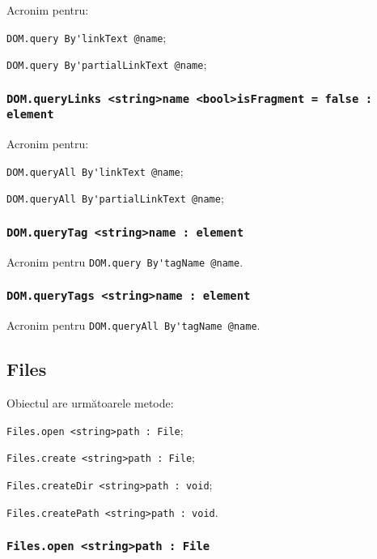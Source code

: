 Acronim pentru:
\begin{icItems}
	\item \lstinline|DOM.query By'linkText @name|;
	\item \lstinline|DOM.query By'partialLinkText @name|;
\end{icItems}

\subsubsection{\lstinline|DOM.queryLinks <string>name <bool>isFragment = false : element|}

Acronim pentru:
\begin{icItems}
	\item \lstinline|DOM.queryAll By'linkText @name|;
	\item \lstinline|DOM.queryAll By'partialLinkText @name|;
\end{icItems}

\subsubsection{\lstinline|DOM.queryTag <string>name : element|}

Acronim pentru \lstinline|DOM.query By'tagName @name|.

\subsubsection{\lstinline|DOM.queryTags <string>name : element|}

Acronim pentru \lstinline|DOM.queryAll By'tagName @name|.

\subsection{{\color{orange} Files}}

Obiectul \files{} are următoarele metode:
\begin{icItems}
	\item \lstinline|Files.open <string>path : File|;
	\item \lstinline|Files.create <string>path : File|;
	\item \lstinline|Files.createDir <string>path : void|;
	\item \lstinline|Files.createPath <string>path : void|.
\end{icItems}

\subsubsection{\lstinline|Files.open <string>path : File|}

